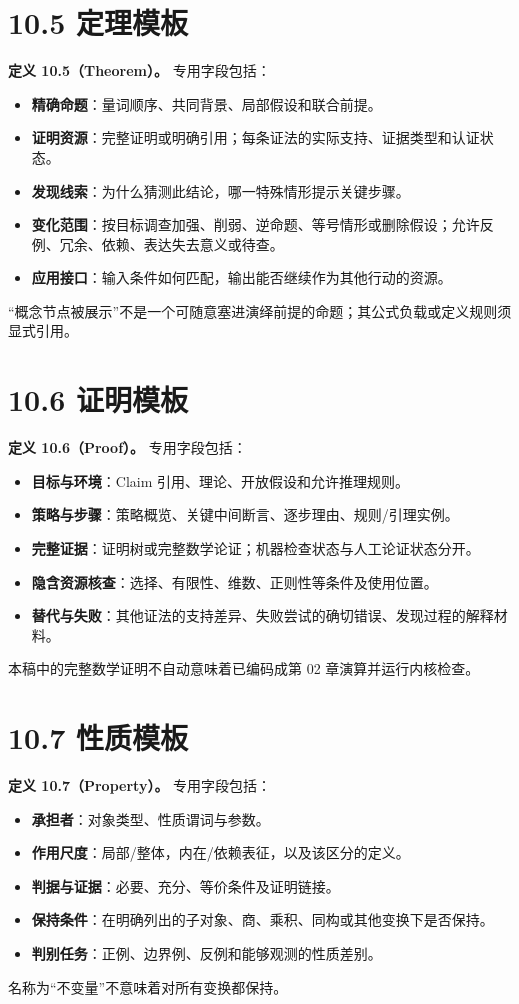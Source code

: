 \documentclass[UTF8,a4paper,zihao=-4,fontset=windows,openany]{ctexbook}
\begin{document}
\section{10.5 定理模板}
\textbf{定义 10.5（Theorem）。} 专用字段包括：

\begin{itemize}
\item \textbf{精确命题}：量词顺序、共同背景、局部假设和联合前提。
\item \textbf{证明资源}：完整证明或明确引用；每条证法的实际支持、证据类型和认证状态。
\item \textbf{发现线索}：为什么猜测此结论，哪一特殊情形提示关键步骤。
\item \textbf{变化范围}：按目标调查加强、削弱、逆命题、等号情形或删除假设；允许反例、冗余、依赖、表达失去意义或待查。
\item \textbf{应用接口}：输入条件如何匹配，输出能否继续作为其他行动的资源。
\end{itemize}
“概念节点被展示”不是一个可随意塞进演绎前提的命题；其公式负载或定义规则须显式引用。

\section{10.6 证明模板}
\textbf{定义 10.6（Proof）。} 专用字段包括：

\begin{itemize}
\item \textbf{目标与环境}：Claim 引用、理论、开放假设和允许推理规则。
\item \textbf{策略与步骤}：策略概览、关键中间断言、逐步理由、规则/引理实例。
\item \textbf{完整证据}：证明树或完整数学论证；机器检查状态与人工论证状态分开。
\item \textbf{隐含资源核查}：选择、有限性、维数、正则性等条件及使用位置。
\item \textbf{替代与失败}：其他证法的支持差异、失败尝试的确切错误、发现过程的解释材料。
\end{itemize}
本稿中的完整数学证明不自动意味着已编码成第 02 章演算并运行内核检查。

\section{10.7 性质模板}
\textbf{定义 10.7（Property）。} 专用字段包括：

\begin{itemize}
\item \textbf{承担者}：对象类型、性质谓词与参数。
\item \textbf{作用尺度}：局部/整体，内在/依赖表征，以及该区分的定义。
\item \textbf{判据与证据}：必要、充分、等价条件及证明链接。
\item \textbf{保持条件}：在明确列出的子对象、商、乘积、同构或其他变换下是否保持。
\item \textbf{判别任务}：正例、边界例、反例和能够观测的性质差别。
\end{itemize}
名称为“不变量”不意味着对所有变换都保持。
\end{document}
